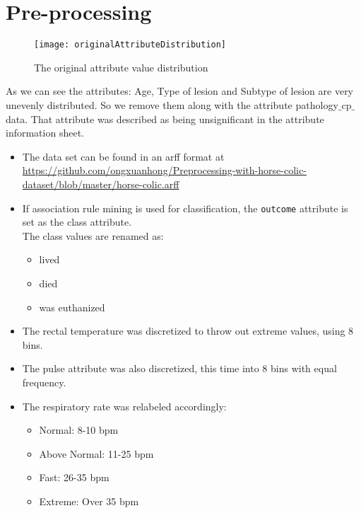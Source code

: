 \section{Pre-processing}

\begin{figure}[h!]
\centering
\texttt{[image: originalAttributeDistribution]}
\caption{The original attribute value distribution}
\end{figure}

As we can see the attributes: Age, Type of lesion and Subtype of lesion are very unevenly distributed. So we remove them along with the attribute pathology$\_$cp$\_$data. That attribute was described as being unsignificant in the attribute information sheet.

\begin{itemize}

\item The data set can be found in an arff format at \\ \href{github.com/ongxuanhong/Preprocessing-with-horse-colic-dataset/blob/master/horse-colic.arff}{https://github.com/ongxuanhong/Preprocessing-with-horse-colic-dataset/blob/master/horse-colic.arff}

\item If association rule mining is used for classification, the \verb|outcome| attribute is set as the class attribute.\\
The class values are renamed as:
\begin{itemize}
\item lived
\item died
\item was euthanized
\end{itemize}

\item The rectal temperature was discretized to throw out extreme values, using 8 bins.

\item The pulse attribute was also discretized, this time into 8 bins with equal frequency.

\item The respiratory rate was relabeled accordingly:
\begin{itemize}
\item Normal: 8-10 bpm
\item Above Normal: 11-25 bpm
\item Fast: 26-35 bpm
\item Extreme: Over 35 bpm
\end{itemize}


\end{itemize}
